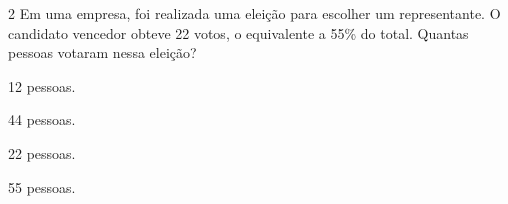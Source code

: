 







\num{2} Em uma empresa, foi realizada uma eleição para escolher um
representante. O candidato vencedor obteve 22 votos, o equivalente a
55\% do total. Quantas pessoas votaram nessa eleição?

\begin{escolha}[itemsep=0pt]
\item 12 pessoas.
\item 44 pessoas.
\item 22 pessoas.
\item 55 pessoas.
\end{escolha}











